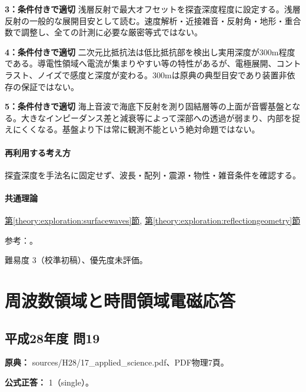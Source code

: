 \noindent\textbf{3：条件付きで適切} 浅層反射で最大オフセットを探査深度程度に設定する。浅層反射の一般的な展開目安として読む。速度解析・近接雑音・反射角・地形・重合数で調整し、全ての計測に必要な厳密等式ではない。\par

\noindent\textbf{4：条件付きで適切} 二次元比抵抗法は低比抵抗部を検出し実用深度が300m程度である。導電性領域へ電流が集まりやすい等の特性があるが、電極展開、コントラスト、ノイズで感度と深度が変わる。300mは原典の典型目安であり装置非依存の保証ではない。\par

\noindent\textbf{5：条件付きで適切} 海上音波で海底下反射を測り固結層等の上面が音響基盤となる。大きなインピーダンス差と減衰等によって深部への透過が弱まり、内部を捉えにくくなる。基盤より下は常に観測不能という絶対命題ではない。\par

\paragraph{再利用する考え方} 探査深度を手法名に固定せず、波長・配列・震源・物性・雑音条件を確認する。

\paragraph{共通理論} \hyperref[theory:exploration:surfacewaves]{第\ref*{theory:exploration:surfacewaves}節}, \hyperref[theory:exploration:reflectiongeometry]{第\ref*{theory:exploration:reflectiongeometry}節}

\par 参考：\cite{moe_surface2004,epa_surfacewaves,segj_integrated2017,epa_seismic_reflection}。

\par 難易度 3（校準初稿）、優先度未評価。

\section{周波数領域と時間領域電磁応答}

\subsection{平成28年度 問19}
\label{q:h28-reg-applied-19}

\noindent\textbf{原典：} sources/H28/17\_applied\_science.pdf、PDF物理7頁。

\textbf{公式正答：} 1（single）。

